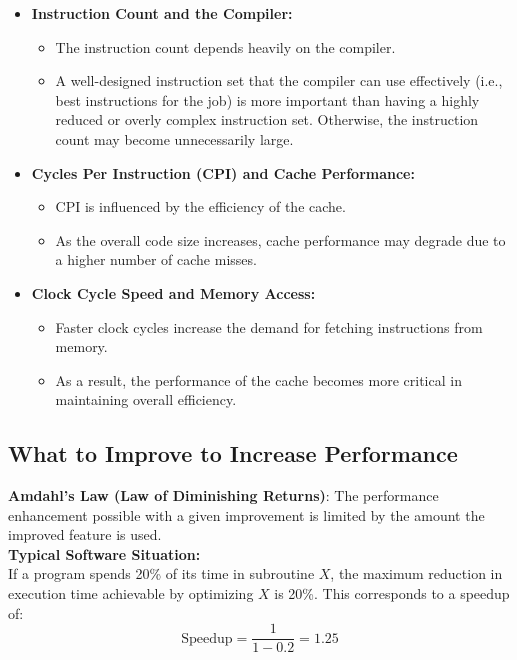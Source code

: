 \begin{itemize}
    \item \textbf{Instruction Count and the Compiler:}
    \begin{itemize}
        \item The instruction count depends heavily on the compiler.
        \item A well-designed instruction set that the compiler can use effectively (i.e., best instructions for the job) is more important than having a highly reduced or overly complex instruction set. Otherwise, the instruction count may become unnecessarily large.
    \end{itemize}

    \item \textbf{Cycles Per Instruction (CPI) and Cache Performance:}
    \begin{itemize}
        \item CPI is influenced by the efficiency of the cache.
        \item As the overall code size increases, cache performance may degrade due to a higher number of cache misses.
    \end{itemize}

    \item \textbf{Clock Cycle Speed and Memory Access:}
    \begin{itemize}
        \item Faster clock cycles increase the demand for fetching instructions from memory.
        \item As a result, the performance of the cache becomes more critical in maintaining overall efficiency.
    \end{itemize}
\end{itemize}

\subsection{What to Improve to Increase Performance}

\textbf{Amdahl's Law (Law of Diminishing Returns)}:
The performance enhancement possible with a given improvement is limited by the amount the improved feature is used. \\

\textbf{Typical Software Situation:} \\
If a program spends 20\% of its time in subroutine $X$, the maximum reduction in execution time achievable by optimizing $X$ is 20\%. This corresponds to a speedup of:
\[
\text{Speedup} = \frac{1}{1 - 0.2} = 1.25
\]

